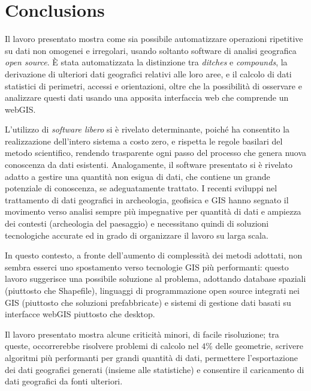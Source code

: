 \chapter{Conclusions}

    \begin{chaptersum}
        Il lavoro presentato mostra come sia possibile automatizzare operazioni ripetitive su dati non omogenei e irregolari, usando soltanto software di analisi geografica \emph{open source}. È stata automatizzata la distinzione tra \emph{ditches} e \emph{compounds}, la derivazione di ulteriori dati geografici relativi alle loro aree, e il calcolo di dati statistici di perimetri, accessi e orientazioni, oltre che la possibilità di osservare e analizzare questi dati usando una apposita interfaccia web che comprende un webGIS.

        L'utilizzo di \emph{software libero} si è rivelato determinante, poiché ha consentito la realizzazione dell'intero sistema a costo zero, e rispetta le regole basilari del metodo scientifico, rendendo trasparente ogni passo del processo che genera nuova conoscenza da dati esistenti. Analogamente, il software presentato si è rivelato adatto a gestire una quantità non esigua di dati, che contiene un grande potenziale di conoscenza, se adeguatamente trattato. I recenti sviluppi nel trattamento di dati geografici in archeologia, geofisica e GIS hanno segnato il movimento verso analisi sempre più impegnative per quantità di dati e ampiezza dei contesti (archeologia del paesaggio) e necessitano quindi di soluzioni tecnologiche accurate ed in grado di organizzare il lavoro su larga scala.

        In questo contesto, a fronte dell'aumento di complessità dei metodi adottati, non sembra esserci uno spostamento verso tecnologie GIS più performanti: questo lavoro suggerisce una possibile soluzione al problema, adottando database spaziali (piuttosto che Shapefile), linguaggi di programmazione open source integrati nei GIS (piuttosto che soluzioni prefabbricate) e sistemi di gestione dati basati su interfacce webGIS piuttosto che desktop.

        Il lavoro presentato mostra alcune criticità minori, di facile risoluzione; tra queste, occorrerebbe risolvere problemi di calcolo nel $4\%$ delle geometrie, scrivere algoritmi più performanti per grandi quantità di dati, permettere l'esportazione dei dati geografici generati (insieme alle statistiche) e consentire il caricamento di dati geografici da fonti ulteriori.
    \end{chaptersum}

